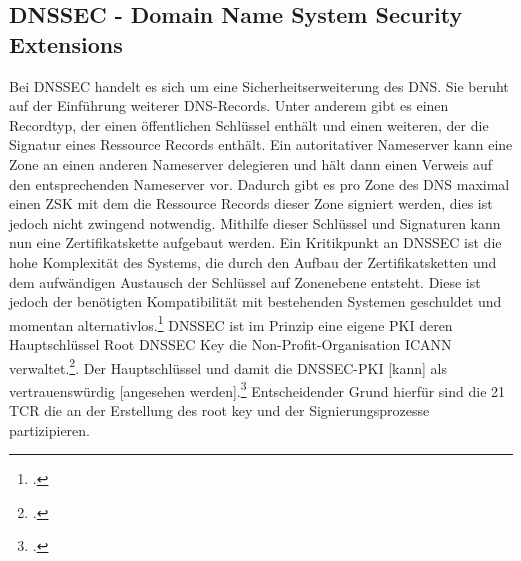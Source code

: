 \documentclass  [paper=a4,
				fontsize=12pt,
				listof=totoc,
				bibliography=totoc
				]{scrreprt}
\begin{document}
		\subsection{DNSSEC - Domain Name System Security Extensions}
		\label{subsec:dnssec}
			Bei \ac{DNSSEC} handelt es sich um eine Sicherheitserweiterung des \ac{DNS}.
			Sie beruht auf der Einführung weiterer \ac{DNS}-Records.
			Unter anderem gibt es einen Recordtyp, der einen öffentlichen Schlüssel enthält und einen weiteren, der die Signatur eines Ressource Records enthält.
			Ein autoritativer Nameserver kann eine Zone an einen anderen Nameserver delegieren und hält dann einen Verweis auf den entsprechenden Nameserver vor.
			Dadurch gibt es pro Zone des \ac{DNS} maximal einen \ac{ZSK} mit dem die Ressource Records dieser Zone signiert werden, dies ist jedoch nicht zwingend notwendig.
			Mithilfe dieser Schlüssel und Signaturen kann nun eine Zertifikatskette aufgebaut werden.
			Ein Kritikpunkt an \ac{DNSSEC} ist die hohe Komplexität des Systems, die durch den Aufbau der Zertifikatsketten und dem aufwändigen Austausch der Schlüssel auf Zonenebene entsteht.
			Diese ist jedoch der benötigten Kompatibilität mit bestehenden Systemen geschuldet und momentan alternativlos.\footcite[Vgl.][S. 195]{Sorge2013}
			\ac{DNSSEC} ist im Prinzip eine eigene \ac{PKI} deren Hauptschlüssel Root DNSSEC Key die Non-Profit-Organisation \ac{ICANN} verwaltet.\footcite{Koetter2014}. Der \glqq Hauptschlüssel und damit die \ac{DNSSEC}-\ac{PKI} [kann] als vertrauenswürdig [angesehen werden].\grqq\footcite{Koetter2014} Entscheidender Grund hierfür sind die 21 \ac{TCR} die an der Erstellung des root key und der Signierungsprozesse partizipieren.
	
\end{document}
